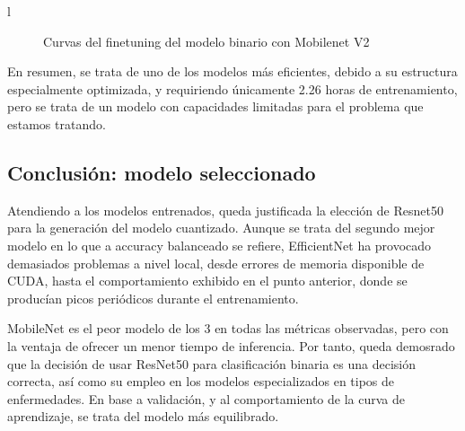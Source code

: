 l\begin{figure}[H]
	\centering
	\caption{Curvas del finetuning del modelo binario con Mobilenet V2}
	\label{fig:curvasmbin}
\end{figure}

En resumen, se trata de uno de los modelos más eficientes,    debido a su estructura especialmente optimizada, y requiriendo únicamente 2.26 horas de entrenamiento, pero se trata de un modelo con capacidades limitadas para el problema que estamos tratando.

\subsection{Conclusión: modelo seleccionado}

Atendiendo a los modelos entrenados, queda justificada la elección de Resnet50 para la generación del modelo cuantizado. Aunque se trata del segundo mejor modelo en lo que a accuracy balanceado se refiere, EfficientNet ha provocado demasiados problemas a nivel local, desde errores de memoria disponible de CUDA, hasta el comportamiento exhibido en el punto anterior, donde se producían picos periódicos durante el entrenamiento.

MobileNet es el peor modelo de los 3 en todas las métricas observadas, pero con la ventaja de ofrecer un menor tiempo de inferencia. Por tanto, queda demosrado que la decisión de usar ResNet50 para clasificación binaria es una decisión correcta, así como su empleo en los modelos especializados en tipos de enfermedades. En base a validación, y al comportamiento de la curva de aprendizaje, se trata del modelo más equilibrado.


